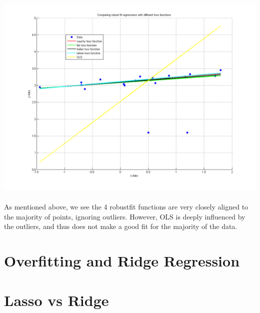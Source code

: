 \documentclass[paper=a4, fontsize=11pt]{scrartcl} %
\numberwithin{equation}{section} %
\numberwithin{figure}{section} %
\numberwithin{table}{section} %
\begin{document}
	\hspace*{-3cm}\includegraphics[scale=0.7]{all_methods_graph}
	\\\\
	As mentioned above, we see the 4 robustfit functions are very closely aligned to the majority of points, ignoring outliers. However, OLS is deeply influenced by the outliers, and thus does not make a good fit for the majority of the data.
	
	
	\newpage
	\section{Overfitting and Ridge Regression}
	
	\newpage
	\section{Lasso vs Ridge}
	
\end{document}
